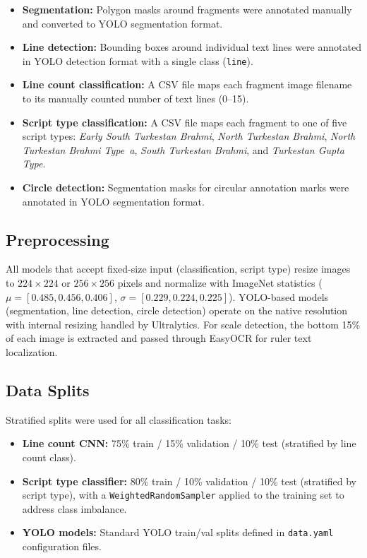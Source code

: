 \documentclass[11pt]{article}
\begin{document}
\begin{itemize}
  \item \textbf{Segmentation:} Polygon masks around fragments were annotated manually and converted to YOLO segmentation format.
  \item \textbf{Line detection:} Bounding boxes around individual text lines were annotated in YOLO detection format with a single class (\texttt{line}).
  \item \textbf{Line count classification:} A CSV file maps each fragment image filename to its manually counted number of text lines (0--15).
  \item \textbf{Script type classification:} A CSV file maps each fragment to one of five script types: \textit{Early South Turkestan Brahmi}, \textit{North Turkestan Brahmi}, \textit{North Turkestan Brahmi Type~a}, \textit{South Turkestan Brahmi}, and \textit{Turkestan Gupta Type}.
  \item \textbf{Circle detection:} Segmentation masks for circular annotation marks were annotated in YOLO segmentation format.
\end{itemize}

\subsection{Preprocessing}

All models that accept fixed-size input (classification, script type) resize images to $224 \times 224$ or $256 \times 256$ pixels and normalize with ImageNet statistics ($\mu = [0.485, 0.456, 0.406]$, $\sigma = [0.229, 0.224, 0.225]$).
YOLO-based models (segmentation, line detection, circle detection) operate on the native resolution with internal resizing handled by Ultralytics.
For scale detection, the bottom 15\% of each image is extracted and passed through EasyOCR for ruler text localization.

\subsection{Data Splits}

Stratified splits were used for all classification tasks:

\begin{itemize}
  \item \textbf{Line count CNN:} 75\% train / 15\% validation / 10\% test (stratified by line count class).
  \item \textbf{Script type classifier:} 80\% train / 10\% validation / 10\% test (stratified by script type), with a \texttt{WeightedRandomSampler} applied to the training set to address class imbalance.
  \item \textbf{YOLO models:} Standard YOLO train/val splits defined in \texttt{data.yaml} configuration files.
\end{itemize}
\end{document}
